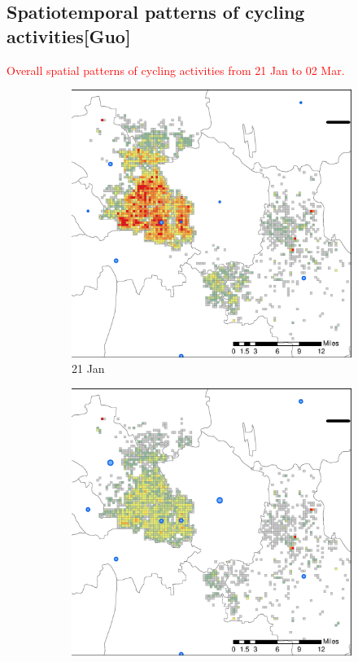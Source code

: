 \documentclass[preprints,ijgi,submit,moreauthors]{Definitions/mdpi}
\begin{document}
\subsection{Spatiotemporal patterns of cycling activities\textbf{[Guo]}}

\textcolor{red}{Overall spatial patterns of cycling activities from 21 Jan to 02 Mar.}

\begin{figure}[H]
    \centering
    \begin{subfigure}{.23\textwidth}
        \includegraphics[width=\textwidth]{Figures/Figure7/NewDistrictSSBD2020_01_21.eps}
        \caption{21 Jan}
    \end{subfigure}
    \begin{subfigure}{.23\textwidth}
        \includegraphics[width=\textwidth]{Figures/Figure7/NewDistrictSSBD2020_01_25.eps}

\end{subfigure}
\end{figure}
\end{document}
